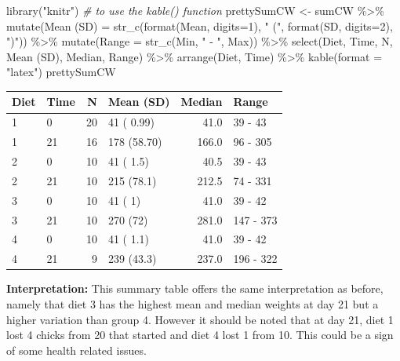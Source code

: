 \documentclass[
  14pt,
]{memoir}
\newenvironment{Shaded}{\begin{snugshade}}{\end{snugshade}}
\newcommand{\AttributeTok}[1]{\textcolor[rgb]{0.77,0.63,0.00}{#1}}
\newcommand{\CommentTok}[1]{\textcolor[rgb]{0.56,0.35,0.01}{\textit{#1}}}
\newcommand{\DecValTok}[1]{\textcolor[rgb]{0.00,0.00,0.81}{#1}}
\newcommand{\FunctionTok}[1]{\textcolor[rgb]{0.00,0.00,0.00}{#1}}
\newcommand{\NormalTok}[1]{#1}
\newcommand{\OtherTok}[1]{\textcolor[rgb]{0.56,0.35,0.01}{#1}}
\newcommand{\SpecialCharTok}[1]{\textcolor[rgb]{0.00,0.00,0.00}{#1}}
\newcommand{\StringTok}[1]{\textcolor[rgb]{0.31,0.60,0.02}{#1}}
\begin{document}
\begin{Shaded}
\begin{Highlighting}[]
\FunctionTok{library}\NormalTok{(}\StringTok{"knitr"}\NormalTok{) }\CommentTok{\# to use the kable() function}
\NormalTok{prettySumCW }\OtherTok{\textless{}{-}}\NormalTok{ sumCW }\SpecialCharTok{\%\textgreater{}\%} 
 \FunctionTok{mutate}\NormalTok{(}\StringTok{\textasciigrave{}}\AttributeTok{Mean (SD)}\StringTok{\textasciigrave{}} \OtherTok{=} \FunctionTok{str\_c}\NormalTok{(}\FunctionTok{format}\NormalTok{(Mean, }\AttributeTok{digits=}\DecValTok{1}\NormalTok{),}
           \StringTok{" ("}\NormalTok{, }\FunctionTok{format}\NormalTok{(SD, }\AttributeTok{digits=}\DecValTok{2}\NormalTok{), }\StringTok{")"}\NormalTok{)) }\SpecialCharTok{\%\textgreater{}\%} 
 \FunctionTok{mutate}\NormalTok{(}\AttributeTok{Range =} \FunctionTok{str\_c}\NormalTok{(Min, }\StringTok{" {-} "}\NormalTok{, Max)) }\SpecialCharTok{\%\textgreater{}\%} 
 \FunctionTok{select}\NormalTok{(Diet, Time, N, }\StringTok{\textasciigrave{}}\AttributeTok{Mean (SD)}\StringTok{\textasciigrave{}}\NormalTok{, Median, Range) }\SpecialCharTok{\%\textgreater{}\%}
 \FunctionTok{arrange}\NormalTok{(Diet, Time) }\SpecialCharTok{\%\textgreater{}\%} 
 \FunctionTok{kable}\NormalTok{(}\AttributeTok{format =} \StringTok{"latex"}\NormalTok{)}
\NormalTok{prettySumCW}
\end{Highlighting}
\end{Shaded}

\begin{tabular}{l|l|r|l|r|l}
\hline
Diet & Time & N & Mean (SD) & Median & Range\\
\hline
1 & 0 & 20 & 41 ( 0.99) & 41.0 & 39 - 43\\
\hline
1 & 21 & 16 & 178 (58.70) & 166.0 & 96 - 305\\
\hline
2 & 0 & 10 & 41 ( 1.5) & 40.5 & 39 - 43\\
\hline
2 & 21 & 10 & 215 (78.1) & 212.5 & 74 - 331\\
\hline
3 & 0 & 10 & 41 ( 1) & 41.0 & 39 - 42\\
\hline
3 & 21 & 10 & 270 (72) & 281.0 & 147 - 373\\
\hline
4 & 0 & 10 & 41 ( 1.1) & 41.0 & 39 - 42\\
\hline
4 & 21 & 9 & 239 (43.3) & 237.0 & 196 - 322\\
\hline
\end{tabular}

\textbf{Interpretation:}
This summary table offers the same interpretation as before, namely that diet 3 has the
highest mean and median weights at day 21 but a higher variation than group 4.
However it should be noted that at day 21, diet 1 lost 4 chicks from 20 that started
and diet 4 lost 1 from 10. This could be a sign of some health related issues.
\end{document}
